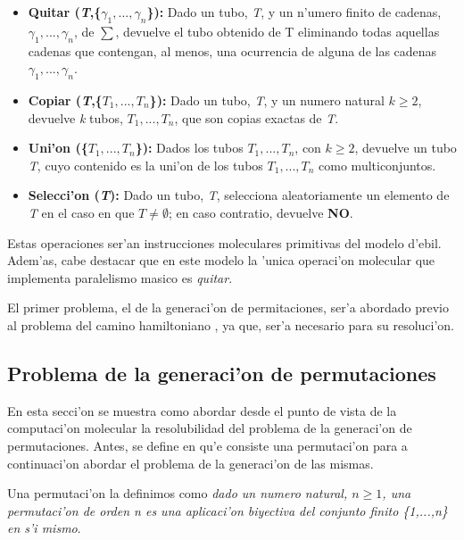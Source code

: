 \documentclass[12pt]{article}
\begin{document}
\begin{itemize}
    \item \textbf{Quitar (\textit{T},\{$ \gamma_{1},...,\gamma_{n} $\}):} Dado un tubo, \textit{T}, y un n'umero finito
    de cadenas, $ \gamma_{1},...,\gamma_{n} $, de $ \sum $, devuelve el tubo obtenido de T eliminando
    todas aquellas cadenas que contengan, al menos, una ocurrencia de alguna de las cadenas
    $ \gamma_{1},...,\gamma_{n} $.
    \item \textbf{Copiar (\textit{T},\{$ \textit{T}_{1},...,\textit{T}_{n} $\}):} Dado un tubo, \textit{T}, y un numero
    natural $ \textit{k} \geq 2 $, devuelve \textit{k} tubos, $\textit{T}_{1},...,\textit{T}_{n}$, que son
    copias exactas de \textit{T}.
    \item \textbf{Uni'on (\{$ \textit{T}_{1},...,\textit{T}_{n} $\}):} Dados los tubos
    $\textit{T}_{1},...,\textit{T}_{n}$, con $ \textit{k} \geq 2 $, devuelve un tubo \textit{T}, cuyo contenido
    es la uni'on de los tubos $\textit{T}_{1},...,\textit{T}_{n}$ como multiconjuntos.
    \item \textbf{Selecci'on (\textit{T}):} Dado un tubo, \textit{T}, selecciona aleatoriamente un elemento de \textit{T}
    en el caso en que $\textit{T} \neq \emptyset$; en caso contratio, devuelve \textbf{NO}.
\end{itemize}

Estas operaciones ser'an instrucciones moleculares primitivas del modelo d'ebil. Adem'as, cabe destacar que
en este modelo la 'unica operaci'on molecular que implementa paralelismo masico es \textit{quitar}.

El primer problema, el de la generaci'on de permitaciones, ser'a abordado previo al problema del camino hamiltoniano
, ya que, ser'a necesario para su resoluci'on.

\subsection{Problema de la generaci'on de permutaciones}

En esta secci'on se muestra como abordar desde el punto de vista de la computaci'on molecular la resolubilidad
del problema de la generaci'on de permutaciones. Antes, se define en qu'e consiste una permutaci'on para a
continuaci'on abordar el problema de la generaci'on de las mismas.

Una permutaci'on la definimos como \textit{dado un numero natural, $n \geq 1$, una permutaci'on de orden n es una
aplicaci'on biyectiva del conjunto finito \{1,...,n\} en s'i mismo}.
\end{document}
